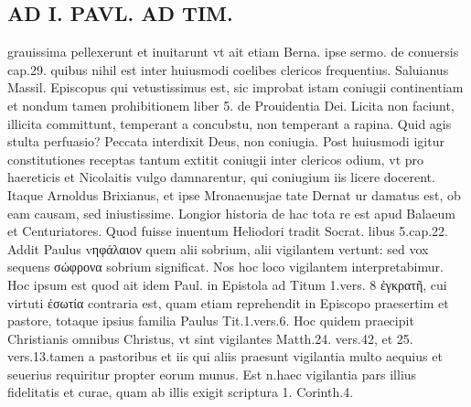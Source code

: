 \documentclass{article}
\begin{document}
\begin{pages}
\section*{AD I. PAVL. AD TIM. }
\marginpar{[ p.118 ]}\pstart grauissima pellexerunt et inuitarunt vt ait etiam Berna. ipse sermo. de conuersis cap.29. quibus nihil est inter huiusmodi coelibes clericos frequentius. Saluianus Massil. Episcopus qui vetustissimus est, sic improbat istam coniugii continentiam et nondum tamen prohibitionem liber  5. de Prouidentia Dei. Licita non faciunt, illicita committunt, temperant a concubstu, non temperant a rapina. Quid agis stulta perfuasio? Peccata interdixit Deus, non coniugia. Post huiusmodi igitur constitutiones receptas tantum extitit coniugii inter clericos odium, vt pro haereticis et Nicolaitis vulgo damnarentur, qui coniugium iis licere docerent. Itaque Arnoldus Brixianus, et ipse Mronaenusjae tate Dernat ur damatus est, ob eam causam, sed iniustissime. Longior historia de hac tota re est apud Balaeum et Centuriatores. Quod fuisse inuentum Heliodori tradit Socrat. libus 5.cap.22.  \pend\pstart Addit Paulus vηφάλαιον quem alii sobrium, alii vigilantem vertunt: sed vox sequens σώφρονα sobrium significat. Nos hoc loco vigilantem interpretabimur. Hoc ipsum est quod ait idem Paul. in Epistola ad Titum 1.vers. 8 ἐγκρατῆ, cui virtuti ἐσωτία contraria est, quam etiam reprehendit in Episcopo praesertim et pastore, totaque ipsius familia Paulus Tit.1.vers.6. Hoc quidem praecipit Christianis omnibus Christus, vt sint vigilantes Matth.24. vers.42, et 25. vers.13.tamen a pastoribus et iis qui aliis praesunt vigilantia multo aequius et seuerius requiritur propter eorum munus. Est n.haec vigilantia pars illius fidelitatis et curae, quam ab illis exigit scriptura 1. Corinth.4.  \pend

\end{pages}
\end{document}
